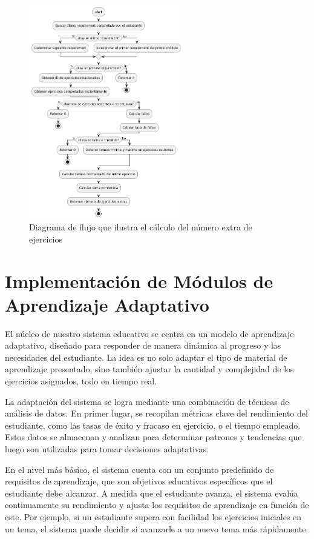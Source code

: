 \begin{figure}[H]
    \centering
    \includegraphics[width=0.6\textwidth]{imagenes/numeroejersextras.png}
    \caption{Diagrama de flujo que ilustra el cálculo del número extra de ejercicios}
    \label{fig:numextraejercicios}
\end{figure}

\section{Implementación de Módulos de Aprendizaje Adaptativo}

El núcleo de nuestro sistema educativo se centra en un modelo de aprendizaje adaptativo, diseñado para responder de manera dinámica al progreso y las necesidades del estudiante. La idea es no solo adaptar el tipo de material de aprendizaje presentado, sino también ajustar la cantidad y complejidad de los ejercicios asignados, todo en tiempo real.

La adaptación del sistema se logra mediante una combinación de técnicas de análisis de datos. En primer lugar, se recopilan métricas clave del rendimiento del estudiante, como las tasas de éxito y fracaso en ejercicio, o el tiempo empleado. Estos datos se almacenan y analizan para determinar patrones y tendencias que luego son utilizadas para tomar decisiones adaptativas.

En el nivel más básico, el sistema cuenta con un conjunto predefinido de requisitos de aprendizaje, que son objetivos educativos específicos que el estudiante debe alcanzar. A medida que el estudiante avanza, el sistema evalúa continuamente su rendimiento y ajusta los requisitos de aprendizaje en función de este. Por ejemplo, si un estudiante supera con facilidad los ejercicios iniciales en un tema, el sistema puede decidir si avanzarle a un nuevo tema más rápidamente.

